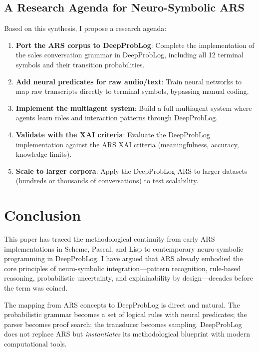\documentclass[12pt,a4paper]{article}
\begin{document}
\subsection{A Research Agenda for Neuro-Symbolic ARS}

Based on this synthesis, I propose a research agenda:

\begin{enumerate}
    \item \textbf{Port the ARS corpus to DeepProbLog}: Complete the 
    implementation of the sales conversation grammar in DeepProbLog, 
    including all 12 terminal symbols and their transition probabilities.
    
    \item \textbf{Add neural predicates for raw audio/text}: Train neural 
    networks to map raw transcripts directly to terminal symbols, bypassing 
    manual coding.
    
    \item \textbf{Implement the multiagent system}: Build a full multiagent 
    system where agents learn roles and interaction patterns through 
    DeepProbLog.
    
    \item \textbf{Validate with the XAI criteria}: Evaluate the DeepProbLog 
    implementation against the ARS XAI criteria (meaningfulness, accuracy, 
    knowledge limits).
    
    \item \textbf{Scale to larger corpora}: Apply the DeepProbLog ARS to 
    larger datasets (hundreds or thousands of conversations) to test 
    scalability.
\end{enumerate}

\section{Conclusion}

This paper has traced the methodological continuity from early ARS 
implementations in Scheme, Pascal, and Lisp to contemporary neuro-symbolic 
programming in DeepProbLog. I have argued that ARS already embodied the 
core principles of neuro-symbolic integration—pattern recognition, rule-based 
reasoning, probabilistic uncertainty, and explainability by design—decades 
before the term was coined.

The mapping from ARS concepts to DeepProbLog is direct and natural. The 
probabilistic grammar becomes a set of logical rules with neural predicates; 
the parser becomes proof search; the transducer becomes sampling. DeepProbLog 
does not replace ARS but \textit{instantiates} its methodological blueprint 
with modern computational tools.
\end{document}
